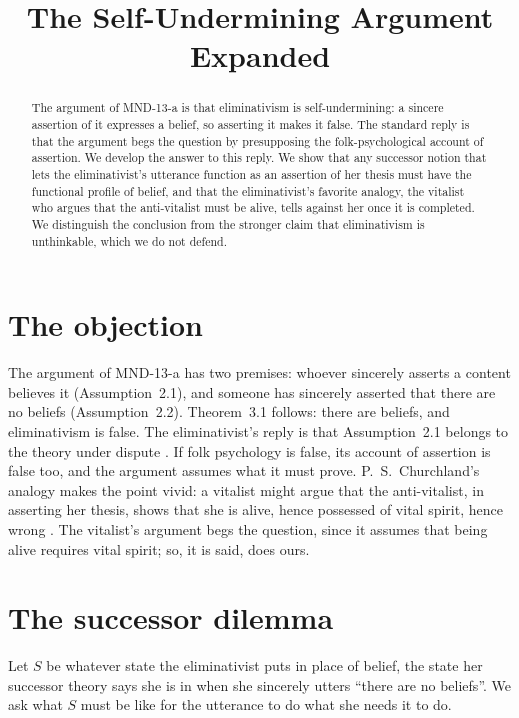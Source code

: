 \documentclass{situationist-preprint}
\title{The Self-Undermining Argument Expanded}
\begin{document}
\maketitle

\begin{abstract}
The argument of MND-13-a is that eliminativism is self-undermining: a sincere assertion of it expresses a belief, so asserting it makes it false. The standard reply is that the argument begs the question by presupposing the folk-psychological account of assertion. We develop the answer to this reply. We show that any successor notion that lets the eliminativist's utterance function as an assertion of her thesis must have the functional profile of belief, and that the eliminativist's favorite analogy, the vitalist who argues that the anti-vitalist must be alive, tells against her once it is completed. We distinguish the conclusion from the stronger claim that eliminativism is unthinkable, which we do not defend.
\end{abstract}

\section{The objection}

The argument of MND-13-a has two premises: whoever sincerely asserts a content believes it (Assumption~2.1), and someone has sincerely asserted that there are no beliefs (Assumption~2.2). Theorem~3.1 follows: there are beliefs, and eliminativism is false. The eliminativist's reply is that Assumption~2.1 belongs to the theory under dispute \citep{Churchland1981}. If folk psychology is false, its account of assertion is false too, and the argument assumes what it must prove. P.~S.~Churchland's analogy makes the point vivid: a vitalist might argue that the anti-vitalist, in asserting her thesis, shows that she is alive, hence possessed of vital spirit, hence wrong \citep{ChurchlandPS1986}. The vitalist's argument begs the question, since it assumes that being alive requires vital spirit; so, it is said, does ours.

\section{The successor dilemma}

Let $S$ be whatever state the eliminativist puts in place of belief, the state her successor theory says she is in when she sincerely utters \enquote{there are no beliefs}. We ask what $S$ must be like for the utterance to do what she needs it to do.
\end{document}
